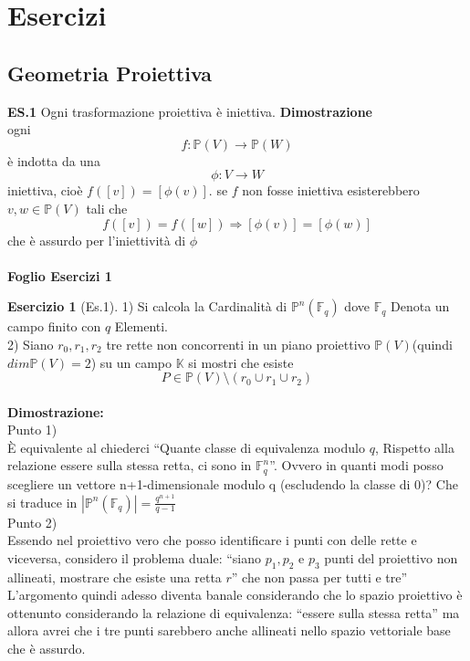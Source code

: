 \documentclass[a4paper,twoside]{article}
\newcommand{\Pro}{\mathbb{P}}
\newcommand{\K}{\mathbb{K}}
\newcommand{\F}{\mathbb{F}}
\newcommand{\nline}{$\phantom{}$\\}
\theoremstyle{definition}
\newtheorem{ex}[theorem]{Esercizio}
\numberwithin{theorem}{section}
\begin{document}
\section{Esercizi}
\subsection{Geometria Proiettiva}
\textbf{ES.1} Ogni trasformazione proiettiva è iniettiva.
\textbf{Dimostrazione}\\
ogni $$f:\Pro(V)\to\Pro(W)$$ è indotta da una $$\phi:V\to W$$
iniettiva, cioè $f([v])=[\phi(v)]$. se $f$ non fosse iniettiva esisterebbero $v,w\in\Pro(V)$ tali che $$f([v])=f([w])\Rightarrow [\phi(v)]=[\phi(w)]$$ che è assurdo per l'iniettività di $\phi$ \nline
\\

\centering \textbf{Foglio Esercizi 1}
\begin{ex}[Es.1]
    1) Si calcola la Cardinalità di $\Pro^n(\F_q)$ dove $\F_q$ Denota un campo finito con $q$ Elementi. \\
    
2) Siano $r_0, r_1,r_2$ tre rette non concorrenti in un piano proiettivo $\Pro(V)$(quindi $dim\Pro(V)=2$) su un campo $\K$ si mostri che esiste $$P\in \Pro(V)\setminus (r_0\cup r_1\cup r_2)$$ \\
\textbf{Dimostrazione:}\\

Punto 1) \\
È equivalente al chiederci “Quante classe di equivalenza modulo $q$, Rispetto alla relazione essere sulla stessa retta, ci sono in $\F_q^n$”. Ovvero in quanti modi posso scegliere un vettore n+1-dimensionale modulo q (escludendo la classe di 0)?
Che si traduce in $|\Pro^n(\F_q)|=\frac{q^{n+1}}{q-1}$\\

Punto 2)\\
Essendo nel proiettivo vero che posso identificare i punti con delle rette e viceversa, considero il problema duale: “siano $p_1,p_2$ e $p_3$ punti del proiettivo non allineati, mostrare che esiste una retta $r$” che non passa per tutti e tre”
L’argomento quindi adesso diventa banale considerando che lo spazio proiettivo è ottenunto considerando la relazione di equivalenza: “essere sulla stessa retta” ma allora avrei che i tre punti sarebbero anche allineati nello spazio vettoriale base che è assurdo.

\end{ex}
\end{document}
